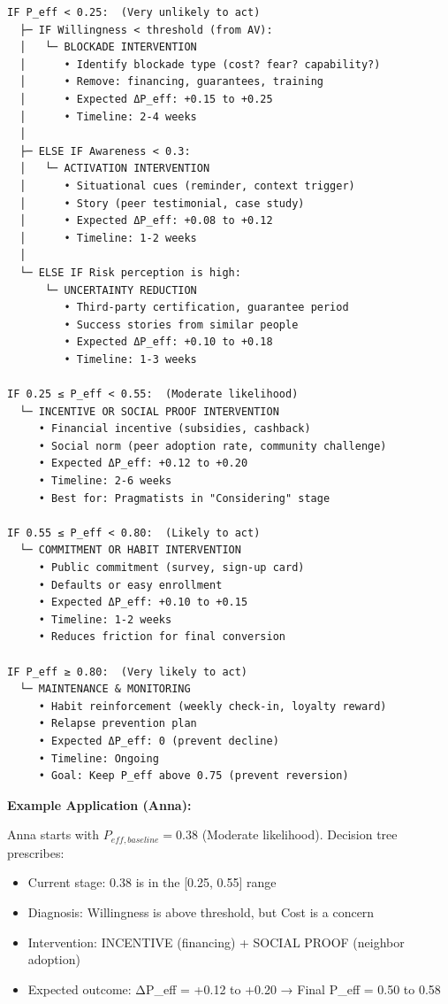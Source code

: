 \begin{tcolorbox}[colback=cyan!5!white, colframe=cyan!75!black, title=Intervention Decision Tree]

\begin{verbatim}
IF P_eff < 0.25:  (Very unlikely to act)
  ├─ IF Willingness < threshold (from AV):
  │   └─ BLOCKADE INTERVENTION
  │      • Identify blockade type (cost? fear? capability?)
  │      • Remove: financing, guarantees, training
  │      • Expected ΔP_eff: +0.15 to +0.25
  │      • Timeline: 2-4 weeks
  │
  ├─ ELSE IF Awareness < 0.3:
  │   └─ ACTIVATION INTERVENTION
  │      • Situational cues (reminder, context trigger)
  │      • Story (peer testimonial, case study)
  │      • Expected ΔP_eff: +0.08 to +0.12
  │      • Timeline: 1-2 weeks
  │
  └─ ELSE IF Risk perception is high:
      └─ UNCERTAINTY REDUCTION
         • Third-party certification, guarantee period
         • Success stories from similar people
         • Expected ΔP_eff: +0.10 to +0.18
         • Timeline: 1-3 weeks

IF 0.25 ≤ P_eff < 0.55:  (Moderate likelihood)
  └─ INCENTIVE OR SOCIAL PROOF INTERVENTION
     • Financial incentive (subsidies, cashback)
     • Social norm (peer adoption rate, community challenge)
     • Expected ΔP_eff: +0.12 to +0.20
     • Timeline: 2-6 weeks
     • Best for: Pragmatists in "Considering" stage

IF 0.55 ≤ P_eff < 0.80:  (Likely to act)
  └─ COMMITMENT OR HABIT INTERVENTION
     • Public commitment (survey, sign-up card)
     • Defaults or easy enrollment
     • Expected ΔP_eff: +0.10 to +0.15
     • Timeline: 1-2 weeks
     • Reduces friction for final conversion

IF P_eff ≥ 0.80:  (Very likely to act)
  └─ MAINTENANCE & MONITORING
     • Habit reinforcement (weekly check-in, loyalty reward)
     • Relapse prevention plan
     • Expected ΔP_eff: 0 (prevent decline)
     • Timeline: Ongoing
     • Goal: Keep P_eff above 0.75 (prevent reversion)
\end{verbatim}

\end{tcolorbox}

\textbf{Example Application (Anna):}

Anna starts with $P_{eff,baseline} = 0.38$ (Moderate likelihood). Decision tree prescribes:
\begin{itemize}[nosep]
    \item Current stage: 0.38 is in the [0.25, 0.55] range
    \item Diagnosis: Willingness is above threshold, but Cost is a concern
    \item Intervention: INCENTIVE (financing) + SOCIAL PROOF (neighbor adoption)
    \item Expected outcome: ΔP_eff = +0.12 to +0.20 → Final P_eff = 0.50 to 0.58
\end{itemize}

